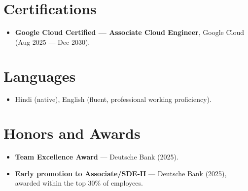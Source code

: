 \documentclass[11pt,a4paper,sans]{moderncv}
\begin{document}

\section{Certifications}
\vspace{1pt}
\begin{itemize}
\item{\textbf{Google Cloud Certified --- Associate Cloud Engineer}, Google Cloud (Aug 2025 --- Dec 2030).}
\end{itemize}


\section{Languages}
\vspace{1pt}
\begin{itemize}
\item Hindi (native), English (fluent, professional working proficiency).
\end{itemize}


\section{Honors and Awards}
\vspace{1pt}
\begin{itemize}
\item{\textbf{Team Excellence Award} --- Deutsche Bank (2025).}
\item{\textbf{Early promotion to Associate/SDE-II} --- Deutsche Bank (2025), awarded within the top 30\% of employees.}
\end{itemize}
\end{document}
